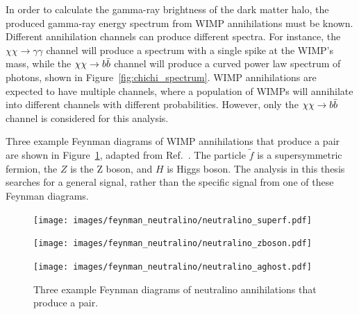     
    
    
    In order to calculate the gamma-ray brightness of the dark matter halo, the produced gamma-ray energy spectrum from WIMP annihilations must be known.
    Different annihilation channels can produce different spectra.
    For instance, the $\chi\chi \rightarrow \gamma\gamma$ channel will produce a spectrum with a single spike at the WIMP's mass, while the $\chi\chi \rightarrow \bbbar{}$ channel will produce a curved power law spectrum of photons, shown in Figure~\ref{fig:chichi_spectrum}.
    WIMP annihilations are expected to have multiple channels, where a population of WIMPs will annihilate into different channels with different probabilities.
    However, only the $\chi\chi \rightarrow \bbbar$ channel is considered for this analysis.
    
    Three example Feynman diagrams of WIMP annihilations that produce a \bbbar pair are shown in Figure~\ref{fig:neutralino_feynman}, adapted from Ref.~\cite{Jungman:1995df}.
    The particle $\tilde{f}$ is a supersymmetric fermion, the $Z$ is the Z boson, and $H$ is Higgs boson.
    The analysis in this thesis searches for a general \bbbar signal, rather than the specific signal from one of these Feynman diagrams.
    
    \begin{figure}[h]
      \centering
      \hfill
      \begin{minipage}{0.17\textwidth}\texttt{[image: images/feynman\_neutralino/neutralino\_superf.pdf]}\end{minipage}\hfill
      \begin{minipage}{0.25\textwidth}\texttt{[image: images/feynman\_neutralino/neutralino\_zboson.pdf]}\end{minipage}\hfill
      \begin{minipage}{0.25\textwidth}\texttt{[image: images/feynman\_neutralino/neutralino\_aghost.pdf]}\end{minipage}\hfill
      \hfill
      \caption[WIMP Annihilation Feynman Diagrams]{
        Three example Feynman diagrams of neutralino annihilations that produce a \bbbar pair.
      }
      \label{fig:neutralino_feynman}
    \end{figure}


